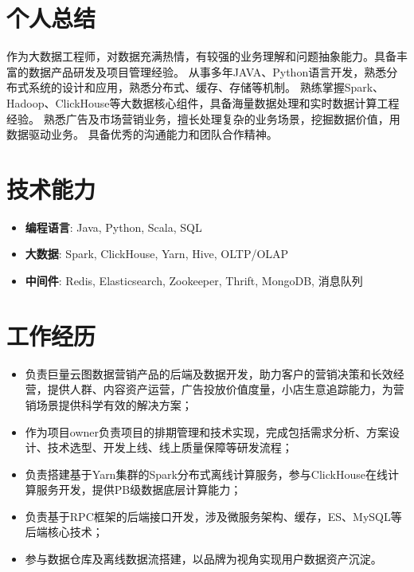 \documentclass{resume}
\begin{document}

 
\section{个人总结}
作为大数据工程师，对数据充满热情，有较强的业务理解和问题抽象能力。具备丰富的数据产品研发及项目管理经验。
从事多年JAVA、Python语言开发，熟悉分布式系统的设计和应用，熟悉分布式、缓存、存储等机制。
熟练掌握Spark、Hadoop、ClickHouse等大数据核心组件，具备海量数据处理和实时数据计算工程经验。
熟悉广告及市场营销业务，擅长处理复杂的业务场景，挖掘数据价值，用数据驱动业务。
具备优秀的沟通能力和团队合作精神。

\section{技术能力}
\begin{itemize}[parsep=0.2ex]
  \item \textbf{编程语言}: Java, Python, Scala, SQL
  \item \textbf{大数据}: Spark, ClickHouse, Yarn, Hive, OLTP/OLAP
  \item \textbf{中间件}: Redis, Elasticsearch, Zookeeper, Thrift, MongoDB, 消息队列
\end{itemize}

\section{工作经历}
\begin{itemize}
  \item 负责巨量云图数据营销产品的后端及数据开发，助力客户的营销决策和长效经营，提供人群、内容资产运营，广告投放价值度量，小店生意追踪能力，为营销场景提供科学有效的解决方案；
  \item 作为项目owner负责项目的排期管理和技术实现，完成包括需求分析、方案设计、技术选型、开发上线、线上质量保障等研发流程；
  \item 负责搭建基于Yarn集群的Spark分布式离线计算服务，参与ClickHouse在线计算服务开发，提供PB级数据底层计算能力；
  \item 负责基于RPC框架的后端接口开发，涉及微服务架构、缓存，ES、MySQL等后端核心技术；
  \item 参与数据仓库及离线数据流搭建，以品牌为视角实现用户数据资产沉淀。
\end{itemize}
\end{document}
